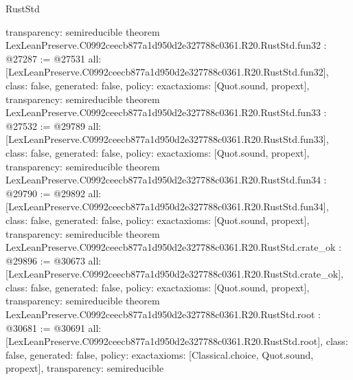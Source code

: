 \begin{lexlean}{RustStd}
\begin{coremodule}
{  transparency: semireducible
}
theorem LexLeanPreserve.C0992ceecb877a1d950d2e327788c0361.R20.RustStd.fun32 : @27287 := @27531 {
  all: [LexLeanPreserve.C0992ceecb877a1d950d2e327788c0361.R20.RustStd.fun32],
  class: false,
  generated: false,
  policy: exact{axioms: [Quot.sound, propext]},
  transparency: semireducible
}
theorem LexLeanPreserve.C0992ceecb877a1d950d2e327788c0361.R20.RustStd.fun33 : @27532 := @29789 {
  all: [LexLeanPreserve.C0992ceecb877a1d950d2e327788c0361.R20.RustStd.fun33],
  class: false,
  generated: false,
  policy: exact{axioms: [Quot.sound, propext]},
  transparency: semireducible
}
theorem LexLeanPreserve.C0992ceecb877a1d950d2e327788c0361.R20.RustStd.fun34 : @29790 := @29892 {
  all: [LexLeanPreserve.C0992ceecb877a1d950d2e327788c0361.R20.RustStd.fun34],
  class: false,
  generated: false,
  policy: exact{axioms: [Quot.sound, propext]},
  transparency: semireducible
}
theorem LexLeanPreserve.C0992ceecb877a1d950d2e327788c0361.R20.RustStd.crate_ok : @29896 := @30673 {
  all: [LexLeanPreserve.C0992ceecb877a1d950d2e327788c0361.R20.RustStd.crate_ok],
  class: false,
  generated: false,
  policy: exact{axioms: [Quot.sound, propext]},
  transparency: semireducible
}
theorem LexLeanPreserve.C0992ceecb877a1d950d2e327788c0361.R20.RustStd.root : @30681 := @30691 {
  all: [LexLeanPreserve.C0992ceecb877a1d950d2e327788c0361.R20.RustStd.root],
  class: false,
  generated: false,
  policy: exact{axioms: [Classical.choice, Quot.sound, propext]},
  transparency: semireducible
}


\end{coremodule}
\end{lexlean}
